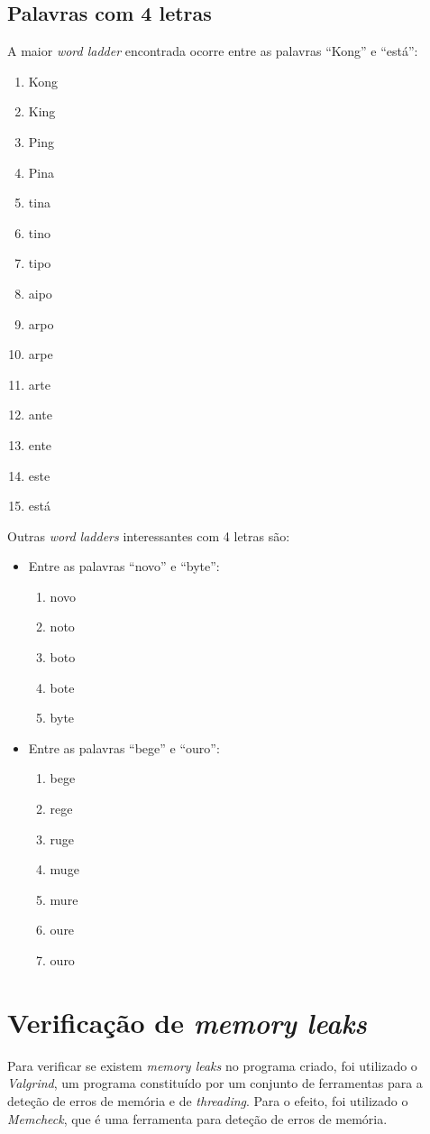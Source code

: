 \documentclass[portuguese,11pt,a4paper,titlepage]{article}
\newcommand{\foreign}[1]{\textit{#1}}
\begin{document}
\subsection{Palavras com 4 letras}
A maior \textit{word ladder} encontrada ocorre entre as palavras ``Kong'' e ``está'':
\begin{enumerate}
	\itemsep 0em
	\item Kong
	\item King
	\item Ping
	\item Pina
	\item tina
	\item tino
	\item tipo
	\item aipo
	\item arpo
	\item arpe
	\item arte
	\item ante
	\item ente
	\item este
	\item está
\end{enumerate}
Outras \textit{word ladders} interessantes com 4 letras são:
\begin{itemize}
	\item Entre as palavras ``novo'' e ``byte'':
	\begin{enumerate}
		\itemsep 0em
		\item novo
		\item noto
		\item boto
		\item bote
		\item byte
	\end{enumerate}
	\item Entre as palavras ``bege'' e ``ouro'':
	\begin{enumerate}
		\itemsep 0em
		\item bege
		\item rege
		\item ruge
		\item muge
		\item mure
		\item oure
		\item ouro
	\end{enumerate}
\end{itemize}

\section{Verificação de \textit{memory leaks}}
Para verificar se existem \textit{memory leaks} no programa criado, foi utilizado o \foreign{Valgrind}, um programa constituído por um conjunto de ferramentas para a deteção de erros de memória e de \foreign{threading}. Para o efeito, foi utilizado o \foreign{Memcheck}, que é uma ferramenta para deteção de erros de memória.
\end{document}
